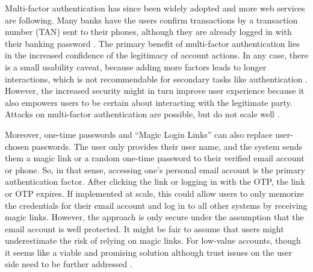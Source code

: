 	Multi-factor authentication has since been widely adopted and more web services are following. Many banks have the users confirm transactions by a transaction number (TAN) sent to their phones, although they are already logged in with their banking password \cite{Maurer2011DataTypeWarnings}. The primary benefit of multi-factor authentication lies in the increased confidence of the legitimacy of account actions. In any case, there is a small usability caveat, because adding more factors leads to longer interactions, which is not recommendable for secondary tasks like authentication \cite{Adams1999UsersEnemy}. However, the increased security might in turn improve user experience because it also empowers users to be certain about interacting with the legitimate party. Attacks on multi-factor authentication are possible, but do not scale well \cite{Herley2014CybercrimeAtScale}.
	
	Moreover, one-time passwords and ``Magic Login Links'' can also replace user-chosen passwords. The user only provides their user name, and the system sends them a magic link or a random one-time password to their verified email account or phone. So, in that sense, accessing one's personal email account is the primary authentication factor. After clicking the link or logging in with the OTP, the link or OTP expires. If implemented at scale, this could allow users to only memorize the credentials for their email account and log in to all other systems by receiving magic links. However, the approach is only secure under the assumption that the email account is well protected. It might be fair to assume that users might underestimate the risk of relying on magic links. For low-value accounts, though it seems like a viable and promising solution although trust issues on the user side need to be further addressed \cite{Ruoti2015AuthenticationMelee}.  
	
